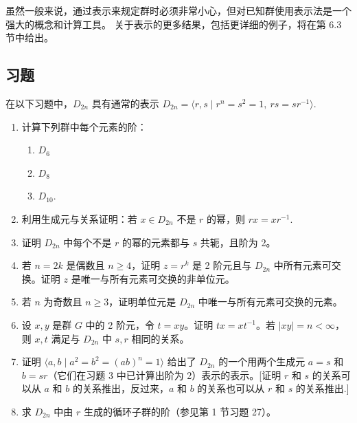虽然一般来说，通过表示来规定群时必须非常小心，但对已知群使用表示法是一个强大的概念和计算工具。
关于表示的更多结果，包括更详细的例子，将在第 6.3 节中给出。

\subsection*{习题}
在以下习题中，\( D_{2n} \) 具有通常的表示 \( D_{2n} = \langle r, s \mid r^n = s^2 = 1,\ rs = sr^{-1} \rangle \).
\begin{enumerate}
\item 计算下列群中每个元素的阶：
\begin{enumerate}
\item \(D_6\)
\item \(D_8\)
\item \(D_{10}\).
\end{enumerate}
\item 利用生成元与关系证明：若 \(x \in D_{2n}\) 不是 \(r\) 的幂，则 \(rx = xr^{-1}\).
\item 证明 \(D_{2n}\) 中每个不是 \(r\) 的幂的元素都与 \(s\) 共轭，且阶为 2。
\item 若 \(n = 2k\) 是偶数且 \(n \ge 4\)，证明 \(z = r^k\) 是 2 阶元且与 \(D_{2n}\) 中所有元素可交换。证明 \(z\) 是唯一与所有元素可交换的非单位元。
\item 若 \(n\) 为奇数且 \(n \ge 3\)，证明单位元是 \(D_{2n}\) 中唯一与所有元素可交换的元素。
\item 设 \(x, y\) 是群 \(G\) 中的 2 阶元，令 \(t = xy\)。证明 \(tx = xt^{-1}\)。若 \(|xy| = n < \infty\)，则 \(x, t\) 满足与 \(D_{2n}\) 中 \(s, r\) 相同的关系。
\item 证明 \( \langle a, b \mid a^2 = b^2 = (ab)^n = 1 \rangle \) 给出了 \( D_{2n} \) 的一个用两个生成元 \( a = s \) 和 \( b = sr \)（它们在习题 3 中已计算出阶为 2）表示的表示。[证明 \( r \) 和 \( s \) 的关系可以从 \( a \) 和 \( b \) 的关系推出，反过来，\( a \) 和 \( b \) 的关系也可以从 \( r \) 和 \( s \) 的关系推出.]
\item 求 \(D_{2n}\) 中由 \(r\) 生成的循环子群的阶（参见第 1 节习题 27）。
\end{enumerate}

